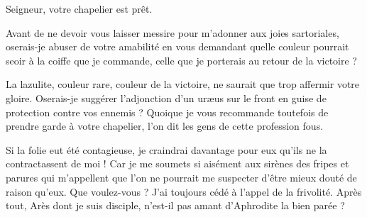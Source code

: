 \begin{drama}
  \intrat{\page}

  \pagespeaks {} Seigneur, votre chapelier est prêt.

  \generalspeaks Avant de ne devoir vous laisser messire \elena{} pour m’adonner aux joies sartoriales, oserais-je abuser de votre amabilité en vous demandant quelle couleur pourrait seoir à la coiffe que je commande, celle que je porterais au retour de la victoire ?

  \elenaspeaks La lazulite, couleur rare, couleur de la victoire, ne saurait que trop affermir votre gloire. Oserais-je suggérer l’adjonction d’un uræus sur le front en guise de protection contre vos ennemis ? Quoique je vous recommande toutefois de prendre garde à votre chapelier, l’on dit les gens de cette profession fous.

  \generalspeaks   Si la folie eut été contagieuse, je craindrai davantage pour eux  qu’ils ne la contractassent de moi ! Car je me soumets si aisément aux sirènes des fripes et parures qui m’appellent que l’on ne pourrait me suspecter d’être mieux douté de raison qu’eux. Que voulez-vous ? J’ai toujours cédé à l’appel de la frivolité. Après tout, Arès dont je suis disciple, n’est-il pas amant d’Aphrodite la bien parée ?


  \exit{\general}

\end{drama}

\scene

\StageDirII{\elena, \alexas}


